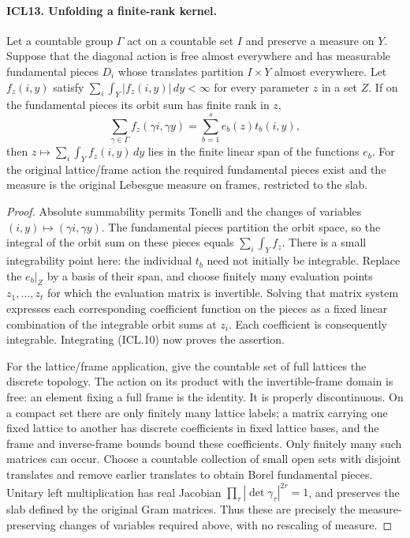 \paragraph{ICL13. Unfolding a finite-rank kernel.}
\label{claim:ICL13}
Let a countable group \(\Gamma\) act on a countable set
\(I\) and preserve a measure on \(Y\).  Suppose that the
diagonal action is free almost everywhere and has measurable
fundamental pieces \(D_i\) whose translates partition
\(I\times Y\) almost everywhere.  Let
\(f_z(i,y)\) satisfy
\(\sum_i\int_Y|f_z(i,y)|\,dy<\infty\) for every
parameter \(z\) in a set \(Z\).  If on the fundamental
pieces its orbit sum has finite rank in \(z\),
\[
 \sum_{\gamma\in\Gamma}f_z(\gamma i,\gamma y)
              =\sum_{b=1}^s e_b(z)t_b(i,y),            \tag{ICL.10}
\]
then \(z\mapsto\sum_i\int_Y f_z(i,y)\,dy\) lies in
the finite linear span of the functions \(e_b\).
For the original lattice/frame action the required
fundamental pieces exist and the measure is the original
Lebesgue measure on frames, restricted to the slab.
\begin{proof}
Absolute summability permits Tonelli and the changes of
variables \((i,y)\mapsto(\gamma i,\gamma y)\).  The
fundamental pieces partition the orbit space, so the
integral of the orbit sum on these pieces equals
\(\sum_i\int_Y f_z\).  There is a small integrability
point here: the individual \(t_b\) need not initially be
integrable.  Replace the \(e_b|_Z\) by a basis of their
span, and choose finitely many evaluation points
\(z_1,\ldots,z_t\) for which the evaluation matrix is
invertible.  Solving that matrix system expresses each
corresponding coefficient function on the pieces as a
fixed linear combination of the integrable orbit sums
at \(z_i\).  Each coefficient is consequently integrable.
Integrating (ICL.10) now proves the assertion.

For the lattice/frame application, give the countable
set of full lattices the discrete topology.  The action
on its product with the invertible-frame domain is free:
an element fixing a full frame is the identity.  It is
properly discontinuous.  On a compact set there are only
finitely many lattice labels; a matrix carrying one
fixed lattice to another has discrete coefficients in
fixed lattice bases, and the frame and inverse-frame
bounds bound these coefficients.  Only finitely many
such matrices can occur.  Choose a countable collection
of small open sets with disjoint translates and remove
earlier translates to obtain Borel fundamental pieces.
Unitary left multiplication has real Jacobian
\(\prod_\tau|\det\gamma_\tau|^{2r}=1\), and preserves
the slab defined by the original Gram matrices.  Thus
these are precisely the measure-preserving changes of
variables required above, with no rescaling of measure.
\end{proof}

